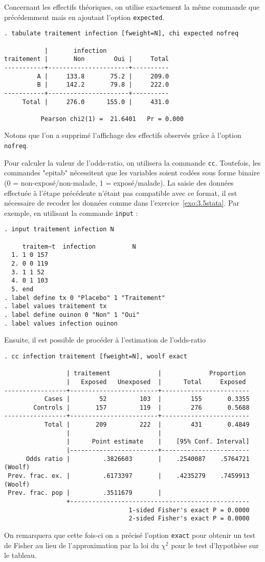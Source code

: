 Concernant les effectifs théoriques, on utilise exactement la même commande
que précédemment mais en ajoutant l'option \texttt{expected}.
\begin{verbatim}
. tabulate traitement infection [fweight=N], chi expected nofreq

           |       infection
traitement |       Non        Oui |     Total
-----------+----------------------+----------
         A |     133.8       75.2 |     209.0 
         B |     142.2       79.8 |     222.0 
-----------+----------------------+----------
     Total |     276.0      155.0 |     431.0 

          Pearson chi2(1) =  21.6401   Pr = 0.000
\end{verbatim}
Notons que l'on a supprimé l'affichage des effectifs observés grâce à
l'option \texttt{nofreq}.

Pour calculer la valeur de l'odds-ratio, on utilisera la commande
\texttt{cc}. Toutefois, les commandes "epitab" nécessitent que les variables
soient codées sous forme binaire (0 = non-exposé/non-malade, 1 =
exposé/malade). La saisie des données effectuée à l'étape précédente n'étant
pas compatible avec ce format, il est nécessaire de recoder les données
comme dans l'exercice~\ref{exo:3.5stata}. Par exemple, en utilisant la
commande \texttt{input} :
\begin{verbatim}
. input traitement infection N

     traitem~t  infection          N
  1. 1 0 157
  2. 0 0 119
  3. 1 1 52
  4. 0 1 103
  5. end
. label define tx 0 "Placebo" 1 "Traitement"
. label values traitement tx
. label define ouinon 0 "Non" 1 "Oui"
. label values infection ouinon
\end{verbatim}
Ensuite, il est possible de procéder à l'estimation de l'odds-ratio
\begin{verbatim}
. cc infection traitement [fweight=N], woolf exact

                 | traitement             |             Proportion
                 |   Exposed   Unexposed  |      Total     Exposed
-----------------+------------------------+------------------------
           Cases |        52         103  |        155       0.3355
        Controls |       157         119  |        276       0.5688
-----------------+------------------------+------------------------
           Total |       209         222  |        431       0.4849
                 |                        |
                 |      Point estimate    |    [95% Conf. Interval]
                 |------------------------+------------------------
      Odds ratio |         .3826603       |    .2540087    .5764721 (Woolf)
 Prev. frac. ex. |         .6173397       |    .4235279    .7459913 (Woolf)
 Prev. frac. pop |         .3511679       |
                 +-------------------------------------------------
                                  1-sided Fisher's exact P = 0.0000
                                  2-sided Fisher's exact P = 0.0000
\end{verbatim}
On remarquera que cette fois-ci on a précisé l'option \texttt{exact} pour
obtenir un test de Fisher au lieu de l'approximation par la loi du $\chi^2$
pour le test d'hypothèse sur le tableau.

